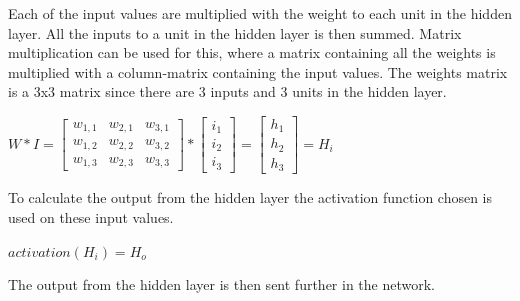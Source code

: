 Each of the input values are multiplied with the weight to each unit in the hidden layer. All the inputs to a unit in the hidden layer is then summed. Matrix multiplication can be used for this, where a matrix containing all the weights is multiplied with a column-matrix containing the input values. The weights matrix is a 3x3 matrix since there are 3 inputs and 3 units in the hidden layer.

\begin{center}
$
W * I = 
\begin{bmatrix} 
w_{1,1} & w_{2,1} & w_{3,1}\\
w_{1,2} & w_{2,2} & w_{3,2}\\
w_{1,3} & w_{2,3} & w_{3,3}
\end{bmatrix}
*
\begin{bmatrix} 
i_1\\
i_2\\
i_3
\end{bmatrix}
=
\begin{bmatrix} 
h_1\\
h_2\\
h_3
\end{bmatrix}
=
H_i
$
\end{center}

To calculate the output from the hidden layer the activation function chosen is used on these input values.

\begin{center}
$
activation(H_i) = H_o
$    
\end{center}

The output from the hidden layer is then sent further in the network.

